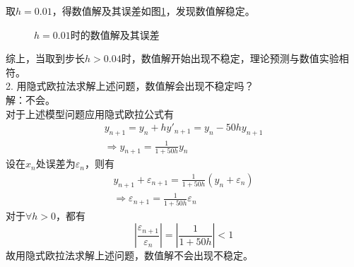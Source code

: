 \documentclass[10pt,a4paper]{article}
\begin{document}
取$h=0.01$，得数值解及其误差如图\ref{1_1_4}，发现数值解稳定。
\begin{figure}[ht]
\centering
{}
\caption{$h=0.01$时的数值解及其误差}\label{1_1_4}
\end{figure}

综上，当取到步长$h>0.04$时，数值解开始出现不稳定，理论预测与数值实验相符。\\

2. 用隐式欧拉法求解上述问题，数值解会出现不稳定吗？\\
解：不会。\\
对于上述模型问题应用隐式欧拉公式有
\begin{gather*}
y_{n+1}=y_n+hy'_{n+1}=y_n-50hy_{n+1}\\
\Longrightarrow y_{n+1}=\frac{1}{1+50h}y_n
\end{gather*}
设在$x_n$处误差为$\varepsilon_n$，则有
\begin{gather*}
y_{n+1}+\varepsilon_{n+1}=\frac{1}{1+50h}(y_n+\varepsilon_n)\\
\Longrightarrow\varepsilon_{n+1}=\frac{1}{1+50h}\varepsilon_n
\end{gather*}
对于$\forall h>0$，都有
\[
|\frac{\varepsilon_{n+1}}{\varepsilon_n}|=|\frac{1}{1+50h}|<1
\]
故用隐式欧拉法求解上述问题，数值解不会出现不稳定。\\
\end{document}
